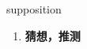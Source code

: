 
\begin{frame}
{\huge supposition}
\begin{center}
\begin{enumerate}\Large
  \item \textbf{猜想，推测}
\end{enumerate}
\end{center}
\end{frame}
